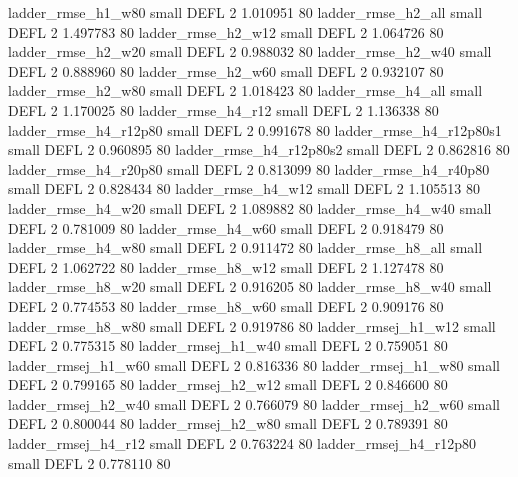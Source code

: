       ladder_rmse_h1_w80      small     DEFL                 2 1.010951 80
      ladder_rmse_h2_all      small     DEFL                 2 1.497783 80
      ladder_rmse_h2_w12      small     DEFL                 2 1.064726 80
      ladder_rmse_h2_w20      small     DEFL                 2 0.988032 80
      ladder_rmse_h2_w40      small     DEFL                 2 0.888960 80
      ladder_rmse_h2_w60      small     DEFL                 2 0.932107 80
      ladder_rmse_h2_w80      small     DEFL                 2 1.018423 80
      ladder_rmse_h4_all      small     DEFL                 2 1.170025 80
      ladder_rmse_h4_r12      small     DEFL                 2 1.136338 80
   ladder_rmse_h4_r12p80      small     DEFL                 2 0.991678 80
 ladder_rmse_h4_r12p80s1      small     DEFL                 2 0.960895 80
 ladder_rmse_h4_r12p80s2      small     DEFL                 2 0.862816 80
   ladder_rmse_h4_r20p80      small     DEFL                 2 0.813099 80
   ladder_rmse_h4_r40p80      small     DEFL                 2 0.828434 80
      ladder_rmse_h4_w12      small     DEFL                 2 1.105513 80
      ladder_rmse_h4_w20      small     DEFL                 2 1.089882 80
      ladder_rmse_h4_w40      small     DEFL                 2 0.781009 80
      ladder_rmse_h4_w60      small     DEFL                 2 0.918479 80
      ladder_rmse_h4_w80      small     DEFL                 2 0.911472 80
      ladder_rmse_h8_all      small     DEFL                 2 1.062722 80
      ladder_rmse_h8_w12      small     DEFL                 2 1.127478 80
      ladder_rmse_h8_w20      small     DEFL                 2 0.916205 80
      ladder_rmse_h8_w40      small     DEFL                 2 0.774553 80
      ladder_rmse_h8_w60      small     DEFL                 2 0.909176 80
      ladder_rmse_h8_w80      small     DEFL                 2 0.919786 80
     ladder_rmsej_h1_w12      small     DEFL                 2 0.775315 80
     ladder_rmsej_h1_w40      small     DEFL                 2 0.759051 80
     ladder_rmsej_h1_w60      small     DEFL                 2 0.816336 80
     ladder_rmsej_h1_w80      small     DEFL                 2 0.799165 80
     ladder_rmsej_h2_w12      small     DEFL                 2 0.846600 80
     ladder_rmsej_h2_w40      small     DEFL                 2 0.766079 80
     ladder_rmsej_h2_w60      small     DEFL                 2 0.800044 80
     ladder_rmsej_h2_w80      small     DEFL                 2 0.789391 80
     ladder_rmsej_h4_r12      small     DEFL                 2 0.763224 80
  ladder_rmsej_h4_r12p80      small     DEFL                 2 0.778110 80
